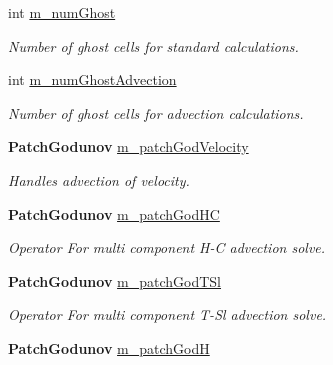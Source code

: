 \begin{DoxyCompactItemize}
int \hyperlink{class_a_m_r_level_mushy_layer_aba35ef990a5a51e81af28856f9bfd095}{m\+\_\+num\+Ghost}
\begin{DoxyCompactList}\small\item\em Number of ghost cells for standard calculations. \end{DoxyCompactList}\item 
int \hyperlink{class_a_m_r_level_mushy_layer_a5ac61ca83db82c5642e21d7cbe83f37b}{m\+\_\+num\+Ghost\+Advection}
\begin{DoxyCompactList}\small\item\em Number of ghost cells for advection calculations. \end{DoxyCompactList}\item 
\mbox{\label{class_a_m_r_level_mushy_layer_a90acda5f43d2b66e4bcbd989f9354b1b}} 
\textbf{ Patch\+Godunov} \hyperlink{class_a_m_r_level_mushy_layer_a90acda5f43d2b66e4bcbd989f9354b1b}{m\+\_\+patch\+God\+Velocity}
\begin{DoxyCompactList}\small\item\em Handles advection of velocity. \end{DoxyCompactList}\item 
\mbox{\label{class_a_m_r_level_mushy_layer_a75f21997491a30f17dfd30f2dd6b3967}} 
\textbf{ Patch\+Godunov} \hyperlink{class_a_m_r_level_mushy_layer_a75f21997491a30f17dfd30f2dd6b3967}{m\+\_\+patch\+God\+HC}
\begin{DoxyCompactList}\small\item\em Operator For multi component H-\/C advection solve. \end{DoxyCompactList}\item 
\mbox{\label{class_a_m_r_level_mushy_layer_a40f638ac59f7b05a5832d28ec2aa9ea6}} 
\textbf{ Patch\+Godunov} \hyperlink{class_a_m_r_level_mushy_layer_a40f638ac59f7b05a5832d28ec2aa9ea6}{m\+\_\+patch\+God\+T\+Sl}
\begin{DoxyCompactList}\small\item\em Operator For multi component T-\/\+Sl advection solve. \end{DoxyCompactList}\item 
\mbox{\label{class_a_m_r_level_mushy_layer_a8f211bc8b76a04f3be8ab05725179b8c}} 
\textbf{ Patch\+Godunov} \hyperlink{class_a_m_r_level_mushy_layer_a8f211bc8b76a04f3be8ab05725179b8c}{m\+\_\+patch\+GodH}

\end{DoxyCompactItemize}
